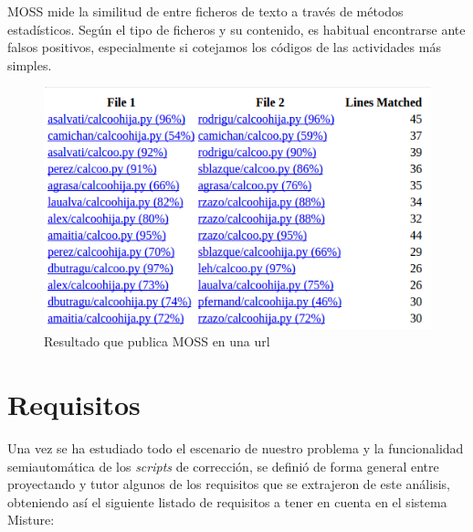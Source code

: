 MOSS mide la similitud de entre ficheros de texto a través de métodos estadísticos. Según el tipo de ficheros y su contenido, es habitual encontrarse ante falsos positivos, especialmente si cotejamos los códigos de las actividades más simples. \newpage %

\begin{figure}[H]
   \centering
   \includegraphics[width=14cm]{img/Selection_021_moss}
   \caption{Resultado que publica MOSS en una url}
   \label{figura:res_moss}
\end{figure}

\section{Requisitos}
\label{sec:requisitos}


Una vez se ha estudiado todo el escenario de nuestro problema y la funcionalidad semiautomática de los \textit{scripts} de corrección, se definió de forma general entre proyectando y tutor algunos de los requisitos que se extrajeron de este análisis, obteniendo así el siguiente listado de requisitos a tener en cuenta en el sistema Misture:

